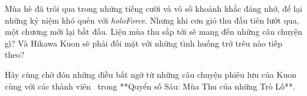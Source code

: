 \documentclass[main.tex]{subfiles}
\begin{document}
Mùa hè đã trôi qua trong những tiếng cười và vô số khoảnh khắc đáng nhớ, để lại những kỷ niệm khó quên với \textit{holoForce}. Nhưng khi cơn gió thu đầu tiên lướt qua, một chương mới lại bắt đầu. Liệu mùa thu sắp tới sẽ mang đến những câu chuyện gì? Và Hikawa Kuon sẽ phải đối mặt với những tình huống trớ trêu nào tiếp theo? 

Hãy cùng chờ đón những điều bất ngờ từ những câu chuyện phiêu lưu của Kuon cùng với các thành viên \hll\ trong **Quyển số Sáu: Mùa Thu của những Trò Lố**.
\end{document}
